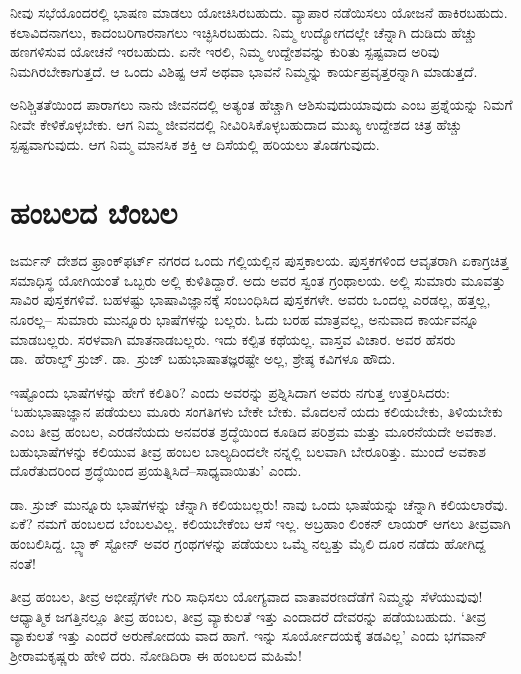 ನೀವು ಸಭೆಯೊಂದರಲ್ಲಿ ಭಾಷಣ ಮಾಡಲು ಯೋಚಿಸಿರಬಹುದು. ವ್ಯಾಪಾರ ನಡೆಯಿಸಲು ಯೋಜನೆ ಹಾಕಿರಬಹುದು. ಕಲಾವಿದನಾಗಲು, ಕಾದಂಬರಿಗಾರನಾಗಲು ಇಚ್ಛಿಸಿರಬಹುದು. ನಿಮ್ಮ ಉದ್ಯೋಗದಲ್ಲೇ ಚೆನ್ನಾಗಿ ದುಡಿದು ಹೆಚ್ಚು ಹಣಗಳಿಸುವ ಯೋಚನೆ ಇರಬಹುದು. ಏನೇ ಇರಲಿ, ನಿಮ್ಮ ಉದ್ದೇಶವನ್ನು ಕುರಿತು ಸ್ಪಷ್ಟವಾದ ಅರಿವು ನಿಮಗಿರಬೇಕಾಗುತ್ತದೆ. ಆ ಒಂದು ವಿಶಿಷ್ಟ ಆಸೆ ಅಥವಾ ಭಾವನೆ ನಿಮ್ಮನ್ನು ಕಾರ್ಯಪ್ರವೃತ್ತರನ್ನಾಗಿ ಮಾಡುತ್ತದೆ.

ಅನಿಶ್ಚಿತತೆಯಿಂದ ಪಾರಾಗಲು ನಾನು ಜೀವನದಲ್ಲಿ ಅತ್ಯಂತ ಹೆಚ್ಚಾಗಿ ಆಶಿಸುವುದು\break ಯಾವುದು ಎಂಬ ಪ್ರಶ್ನೆಯನ್ನು ನಿಮಗೆ ನೀವೇ ಕೇಳಿಕೊಳ್ಳಬೇಕು. ಆಗ ನಿಮ್ಮ ಜೀವನದಲ್ಲಿ ನೀವಿರಿಸಿಕೊಳ್ಳಬಹುದಾದ ಮುಖ್ಯ ಉದ್ದೇಶದ ಚಿತ್ರ ಹೆಚ್ಚು ಸ್ಪಷ್ಟವಾಗುವುದು. ಆಗ ನಿಮ್ಮ ಮಾನಸಿಕ ಶಕ್ತಿ ಆ ದಿಸೆಯಲ್ಲಿ ಹರಿಯಲು ತೊಡಗುವುದು.


\section*{ಹಂಬಲದ ಬೆಂಬಲ}

\vskip -8pt

ಜರ್ಮನ್ ದೇಶದ ಫ್ರಾಂಕ್​ಫರ್ಟ್ ನಗರದ ಒಂದು ಗಲ್ಲಿಯಲ್ಲಿನ ಪುಸ್ತಕಾಲಯ. ಪುಸ್ತಕಗಳಿಂದ ಆವೃತರಾಗಿ ಏಕಾಗ್ರಚಿತ್ತ ಸಮಾಧಿಸ್ಥ ಯೋಗಿಯಂತೆ ಒಬ್ಬರು ಅಲ್ಲಿ ಕುಳಿತಿದ್ದಾರೆ. ಅದು ಅವರ ಸ್ವಂತ ಗ್ರಂಥಾಲಯ. ಅಲ್ಲಿ ಸುಮಾರು ಮೂವತ್ತು ಸಾವಿರ ಪುಸ್ತಕಗಳಿವೆ. ಬಹಳಷ್ಟು ಭಾಷಾವಿಜ್ಞಾನಕ್ಕೆ ಸಂಬಂಧಿಸಿದ ಪುಸ್ತಕಗಳೇ. ಅವರು ಒಂದಲ್ಲ ಎರಡಲ್ಲ, ಹತ್ತಲ್ಲ, ನೂರಲ್ಲ– ಸುಮಾರು ಮುನ್ನೂರು ಭಾಷೆಗಳನ್ನು ಬಲ್ಲರು. ಓದು ಬರಹ ಮಾತ್ರವಲ್ಲ, ಅನುವಾದ ಕಾರ್ಯವನ್ನೂ ಮಾಡಬಲ್ಲರು. ಸರಳವಾಗಿ ಮಾತನಾಡಬಲ್ಲರು. ಇದು ಕಲ್ಪಿತ ಕಥೆಯಲ್ಲ. ವಾಸ್ತವ ವಿಚಾರ. ಅವರ ಹೆಸರು ಡಾ.\ ಹೆರಾಲ್ಡ್ ಸ್ರುಜ್. ಡಾ.\ ಸ್ರುಜ್ ಬಹುಭಾಷಾತಜ್ಞರಷ್ಟೇ ಅಲ್ಲ, ಶ್ರೇಷ್ಠ ಕವಿಗಳೂ ಹೌದು.

ಇಷ್ಟೊಂದು ಭಾಷೆಗಳನ್ನು ಹೇಗೆ ಕಲಿತಿರಿ? ಎಂದು ಅವರನ್ನು ಪ್ರಶ್ನಿಸಿದಾಗ ಅವರು ನಗುತ್ತ ಉತ್ತರಿಸಿದರು: ‘ಬಹುಭಾಷಾಜ್ಞಾನ ಪಡೆಯಲು ಮೂರು ಸಂಗತಿಗಳು ಬೇಕೇ ಬೇಕು. ಮೊದಲನೆ ಯದು ಕಲಿಯಬೇಕು, ತಿಳಿಯಬೇಕು ಎಂಬ ತೀವ್ರ ಹಂಬಲ, ಎರಡನೆಯದು ಅನವರತ ಶ್ರದ್ಧೆಯಿಂದ ಕೂಡಿದ ಪರಿಶ್ರಮ ಮತ್ತು ಮೂರನೆಯದೇ ಅವಕಾಶ. ಬಹುಭಾಷೆಗಳನ್ನು ಕಲಿಯುವ ತೀವ್ರ ಹಂಬಲ ಬಾಲ್ಯದಿಂದಲೇ ನನ್ನಲ್ಲಿ ಬಲವಾಗಿ ಬೇರೂರಿತ್ತು. ಮುಂದೆ ಅವಕಾಶ ದೊರೆತುದರಿಂದ ಶ್ರದ್ಧೆಯಿಂದ ಪ್ರಯತ್ನಿಸಿದೆ–ಸಾಧ್ಯವಾಯಿತು’ ಎಂದು.

ಡಾ. ಸ್ರುಜ್ ಮುನ್ನೂರು ಭಾಷೆಗಳನ್ನು ಚೆನ್ನಾಗಿ ಕಲಿಯಬಲ್ಲರು! ನಾವು ಒಂದು ಭಾಷೆಯನ್ನು ಚೆನ್ನಾಗಿ ಕಲಿಯಲಾರೆವು. ಏಕೆ? ನಮಗೆ ಹಂಬಲದ ಬೆಂಬಲವಿಲ್ಲ. ಕಲಿಯಬೇಕೆಂಬ ಆಸೆ ಇಲ್ಲ. ಅಬ್ರಹಾಂ ಲಿಂಕನ್ ಲಾಯರ್ ಆಗಲು ತೀವ್ರವಾಗಿ ಹಂಬಲಿಸಿದ್ದ. ಬ್ಲ್ಯಾಕ್ ಸ್ಟೋನ್ ಅವರ ಗ್ರಂಥಗಳನ್ನು ಪಡೆಯಲು ಒಮ್ಮೆ ನಲ್ವತ್ತು ಮೈಲಿ ದೂರ ನಡೆದು ಹೋಗಿದ್ದ ನಂತೆ!

ತೀವ್ರ ಹಂಬಲ, ತೀವ್ರ ಅಭೀಪ್ಸೆಗಳೇ ಗುರಿ ಸಾಧಿಸಲು ಯೋಗ್ಯವಾದ ವಾತಾವರಣದೆಡೆಗೆ ನಿಮ್ಮನ್ನು ಸೆಳೆಯುವುವು! ಆಧ್ಯಾತ್ಮಿಕ ಜಗತ್ತಿನಲ್ಲೂ ತೀವ್ರ ಹಂಬಲ, ತೀವ್ರ ವ್ಯಾಕುಲತೆ ಇತ್ತು ಎಂದಾದರೆ ದೇವರನ್ನು ಪಡೆಯಬಹುದು. ‘ತೀವ್ರ ವ್ಯಾಕುಲತೆ ಇತ್ತು ಎಂದರೆ ಅರುಣೋದಯ ವಾದ ಹಾಗೆ. ಇನ್ನು ಸೂರ್ಯೋದಯಕ್ಕೆ ತಡವಿಲ್ಲ’ ಎಂದು ಭಗವಾನ್ ಶ‍್ರೀರಾಮಕೃಷ್ಣರು ಹೇಳಿ ದರು. ನೋಡಿದಿರಾ ಈ ಹಂಬಲದ ಮಹಿಮೆ!

